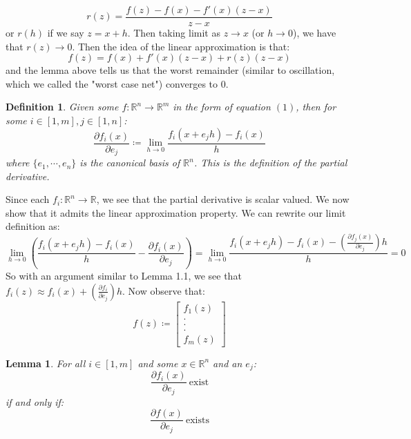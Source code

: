 \documentclass[10pt,letterpaper]{article} %
\newtheorem{lem}{Lemma}[section]
\newtheorem{defn}{Definition}[section]
\begin{document}
\begin{equation*}
r(z) = \frac{f(z) - f(x) - f'(x)(z-x)}{z-x}
\end{equation*}
or $r(h)$ if we say $z = x+h$. Then taking limit as $z \xrightarrow{} x$ (or $h \xrightarrow{} 0$), we have that $r(z) \xrightarrow{} 0$. Then the idea of the linear approximation is that:
\begin{equation*}
f(z) = f(x) + f'(x)(z-x) + r(z)(z-x)
\end{equation*}
and the lemma above tells us that the worst remainder (similar to oscillation, which we called the "worst case net") converges to $0$. 
\medskip
\begin{defn}
Given some $f: \mathbb{R}^n \xrightarrow{} \mathbb{R}^m$ in the form of equation $(1)$, then for some $i \in [1, m], j \in [1, n]$:
\begin{equation*}
\frac{\partial f_i(x)}{\partial e_j} \coloneq \lim_{h \xrightarrow{} 0}\frac{f_i(x + e_jh) - f_i(x)}{h}
\end{equation*}
where $\{e_1,\cdots, e_n\}$ is the canonical basis of $\mathbb{R}^n$. This is the definition of the partial derivative.
\end{defn}
Since each $f_i: \mathbb{R}^n \xrightarrow{} \mathbb{R}$, we see that the partial derivative is scalar valued. We now show that it admits the linear approximation property. We can rewrite our limit definition as:
\begin{equation*}
\lim_{h \xrightarrow{} 0} \left(\frac{f_i(x+e_jh) - f_i(x)}{h} - \frac{\partial f_i(x)}{\partial e_j}\right) = \lim_{h \xrightarrow{} 0} \frac{f_i(x+e_jh) - f_i(x) - (\frac{\partial f_j(x)}{\partial e_j})h}{h} = 0
\end{equation*}
So with an argument similar to Lemma 1.1, we see that $f_i(z) \approx f_i(x) + \left(\frac{\partial f_i}{\partial e_j}\right)h$. Now observe that:
\begin{equation*}
f(z) \coloneq \begin{bmatrix}
f_1(z)\\.\\.\\.\\f_m(z)
\end{bmatrix}
\end{equation*}
\begin{lem}
For all $i \in [1, m]$ and some $x \in \mathbb{R}^n$ and an $e_j$:
\begin{equation*}
\frac{\partial f_i(x)}{\partial e_j} \ \text{exist}
\end{equation*}
if and only if:
\begin{equation*}
\frac{\partial f(x)}{\partial e_j} \ \text{exists}
\end{equation*}
\end{lem}
\end{document}
